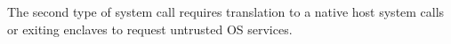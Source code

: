 The second type of system call requires translation to a native host system calls
or exiting enclaves to request
untrusted OS services.

